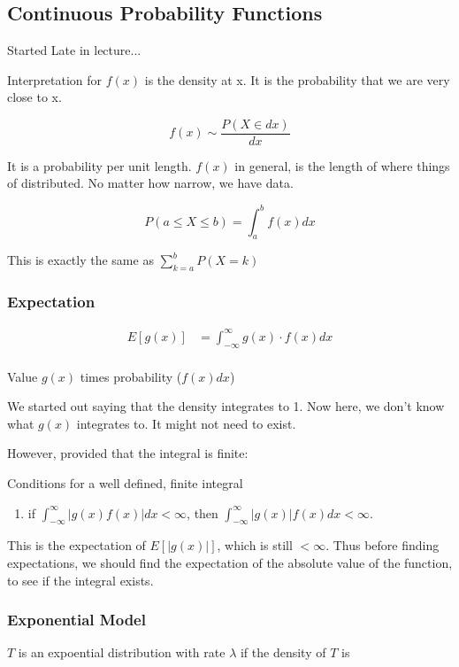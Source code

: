 \documentclass{report}
\begin{document}
\chapter{}
\section{Continuous Probability Functions}


Started Late in lecture... 


Interpretation for $ f(x) $ is the density at x. It is the probability that we are very close to x. 

\[
f(x) \sim \frac{P(X \in dx)}{dx}
\]

It is a probability per unit length. $ f(x) $ in general, is the length of where things of distributed. No matter how narrow, we have data. 


\[
P(a \le X \le b) = \int_{a}^{b} f(x)dx 
\]

This is exactly the same as $ \sum_{k=a}^{b} P(X=k) $ 


\subsection{Expectation}

\begin{align*}
	E[g(x)] &= \int_{-\infty }^{\infty } g(x) \cdot f(x) dx \\
\end{align*}

Value $ g(x) $ times probability ($ f(x)dx $) 

We started out saying that the density integrates to 1. Now here, we don't know what $ g(x) $ integrates to. It might not need to exist.

However, provided that the integral is finite:

Conditions for a well defined, finite integral
\begin{enumerate}
	\item if $ \int_{-\infty}^{\infty} |g(x)f(x)| dx < \infty $, then $ \int_{-\infty}^{\infty} |g(x)| f(x)dx < \infty  $. 
\end{enumerate}


This is the expectation of $ E[|g(x)|] $, which is still $ < \infty  $. Thus before finding expectations, we should find the expectation of the absolute value of the function, to see if the integral exists. 


\subsection{Exponential Model}
$ T $ is an expoential distribution with rate $ \lambda $ if the density of $ T $ is 
\end{document}
